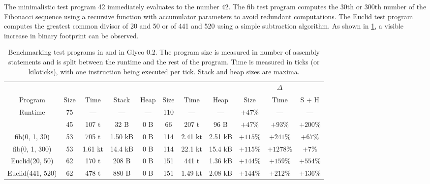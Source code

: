 \documentclass[main.tex]{subfiles}
\begin{document}
The minimalistic test program 42 immediately evaluates to the number 42. The fib test program computes the 30th or 300th number of the Fibonacci sequence using a recursive function with accumulator parameters to avoid redundant computations. The Euclid test program computes the greatest common divisor of 20 and 50 or of 441 and 520 using a simple subtraction algorithm. As shown in \cref{tbl:ghscc-size}, a visible increase in binary footprint can be observed.

\begin{table}[h]
	\medskip	%
	\begin{adjustwidth}{-1in}{-1in}
		\centering
		\footnotesize
		\begin{tabular}{ccccccccccc}
			\toprule
								& \multicolumn{4}{c}{\g{gccc}}			& \multicolumn{3}{c}{\g{ghscc}}		& \multicolumn{3}{c}{$\Delta$}		\\
								\cmidrule(lr){2-5}						\cmidrule(lr){6-8}					\cmidrule(lr){9-11}
			Program				& Size	& Time		& Stack		& Heap	& Size	& Time		& Heap		& Size		& Time		& S + H		\\
			\midrule
			Runtime				& 75	& —			& —			& —		& 110	& —			& —			& $+47\%$	& —			& —			\\
			\addlinespace
			42					& 45	& 107 t		& 32 B		& 0 B	& 66	& 207 t		& 96 B		& $+47\%$	& $+93\%$	& $+200\%$	\\
			fib(0, 1, 30)		& 53	& 705 t		& 1.50 kB	& 0 B	& 114	& 2.41 kt	& 2.51 kB	& $+115\%$	& $+241\%$	& $+67\%$	\\
			fib(0, 1, 300)		& 53	& 1.61 kt	& 14.4 kB	& 0 B	& 114	& 22.1 kt	& 15.4 kB	& $+115\%$	& $+1278\%$	& $+7\%$	\\
			Euclid(20, 50)		& 62	& 170 t		& 208 B		& 0 B	& 151	& 441 t		& 1.36 kB	& $+144\%$	& $+159\%$	& $+554\%$	\\
			Euclid(441, 520)	& 62	& 478 t		& 880 B		& 0 B	& 151	& 1.49 kt	& 2.08 kB	& $+144\%$	& $+212\%$	& $+136\%$	\\
			\bottomrule
		\end{tabular}
	\end{adjustwidth}
	\caption{Benchmarking test programs in  and  in Glyco 0.2. The program size is measured in number of assembly statements and is split between the runtime and the rest of the program. Time is measured in ticks (or kiloticks), with one instruction being executed per tick. Stack and heap sizes are maxima.}
	\label{tbl:ghscc-size}
\end{table}
\end{document}
